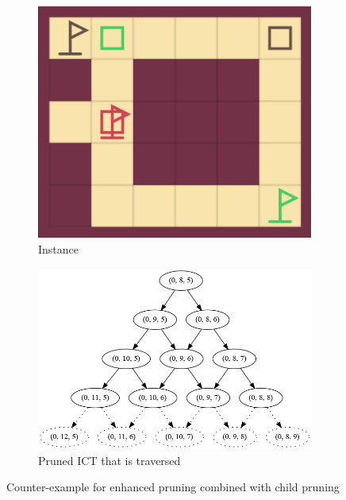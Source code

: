 \documentclass[english,10pt]{article}
\begin{document}
	\begin{figure}[H]
		\centering
		\begin{subfigure}{0.40\textwidth}
			\centering
			\includegraphics[width=\linewidth]{img/counter-example-ep-2}
			\caption{Instance}
			\label{fig:counter-example:a}
		\end{subfigure}
		\begin{subfigure}{0.49\textwidth}
			\centering
			\includegraphics[width=\linewidth]{img/counter-example-tree}
			\caption{Pruned ICT that is traversed}
			\label{fig:counter-example:b}
		\end{subfigure}
		\caption{Counter-example for enhanced pruning combined with child pruning}
		\label{fig:counter-example}
	\end{figure}
\end{document}
